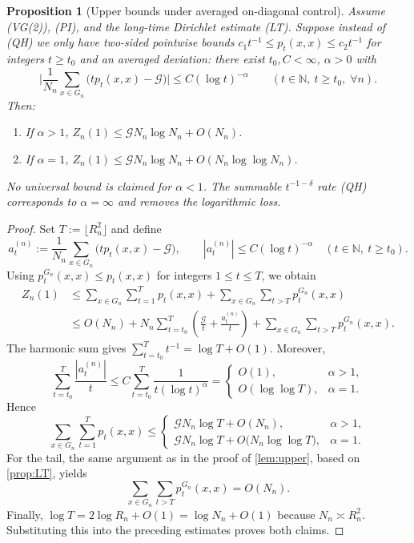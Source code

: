 \documentclass[reqno]{amsart}
\numberwithin{equation}{section}
\newtheorem{proposition}[proposition]{Proposition}
\theoremstyle{definition}
\theoremstyle{remark}
\newcommand{\Cref}[1]{\autoref{#1}}
\newcommand{\cG}{\mathcal{G}}
\begin{document}
\begin{proposition}[Upper bounds under averaged on-diagonal control]\label{prop:weaker_remainder}
Assume (VG(2)), (PI), and the long-time Dirichlet estimate (LT). Suppose instead of (QH) we only have two-sided pointwise bounds $c_1 t^{-1}\le p_t(x,x)\le c_2 t^{-1}$ for integers $t\ge t_0$ and an averaged deviation: there exist $t_0,C<\infty$, $\alpha>0$ with
\[
  \Big| \frac{1}{N_n} \sum_{x\in G_n} \Big( t p_t(x,x) - \cG \Big) \Big| \le C (\log t)^{-\alpha}\qquad(t\in\mathbb N,\ t\ge t_0,\;\forall n).
\]
Then:
\begin{enumerate}
  \item If $\alpha>1$, $Z_n(1)\le\cG N_n \log N_n + O(N_n)$.
  \item If $\alpha=1$, $Z_n(1)\le\cG N_n \log N_n + O(N_n \log\log N_n)$.
\end{enumerate}
\emph{No universal bound is claimed for $\alpha<1$.} The summable $t^{-1-\delta}$ rate (QH) corresponds to $\alpha=\infty$ and removes the logarithmic loss.
\end{proposition}
\begin{proof}
Set $T:=\lfloor R_n^2\rfloor$ and define
\[
  a_t^{(n)}:=\frac1{N_n}\sum_{x\in G_n}\bigl(t p_t(x,x)-\cG\bigr),
  \qquad |a_t^{(n)}|\le C(\log t)^{-\alpha}\quad (t\in\mathbb N,\ t\ge t_0).
\]
Using $p_t^{G_n}(x,x)\le p_t(x,x)$ for integers $1\le t\le T$, we obtain
\begin{align*}
Z_n(1)
&\le \sum_{x\in G_n}\sum_{t=1}^{T} p_t(x,x)
   + \sum_{x\in G_n}\sum_{t>T} p_t^{G_n}(x,x) \\
&\le O(N_n) + N_n\sum_{t=t_0}^{T}\left(\frac{\cG}{t}+\frac{a_t^{(n)}}{t}\right)
   + \sum_{x\in G_n}\sum_{t>T} p_t^{G_n}(x,x).
\end{align*}
The harmonic sum gives $\sum_{t=t_0}^{T} t^{-1}=\log T+O(1)$. Moreover,
\[
\sum_{t=t_0}^{T}\frac{|a_t^{(n)}|}{t}
\le C\sum_{t=t_0}^{T}\frac{1}{t(\log t)^{\alpha}}
=
\begin{cases}
O(1), & \alpha>1,\\[2mm]
O(\log\log T), & \alpha=1.
\end{cases}
\]
Hence
\[
\sum_{x\in G_n}\sum_{t=1}^{T} p_t(x,x)
\le
\begin{cases}
\cG N_n\log T + O(N_n), & \alpha>1,\\[2mm]
\cG N_n\log T + O\bigl(N_n\log\log T\bigr), & \alpha=1.
\end{cases}
\]
For the tail, the same argument as in the proof of \Cref{lem:upper}, based on \Cref{prop:LT}, yields
\[
\sum_{x\in G_n}\sum_{t>T} p_t^{G_n}(x,x)=O(N_n).
\]
Finally, $\log T = 2\log R_n + O(1) = \log N_n + O(1)$ because $N_n\asymp R_n^2$. Substituting this into the preceding estimates proves both claims.
\end{proof}
\end{document}
